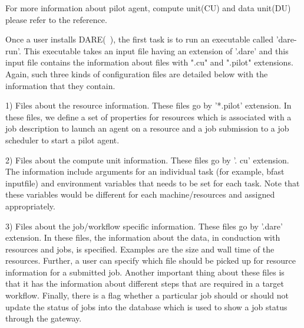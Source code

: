\documentclass[]{svjour3}
\begin{document}
For more information about pilot agent, compute unit(CU) and data unit(DU) please
refer to the reference\cite{pstar11}.

Once a user installs DARE(~\cite{dare_api_web}), the first task is to run an
executable called 'dare-run'. This executable takes an input file having an
extension of '.dare' and this input file contains the information about files
with ".cu" and ".pilot" extensions. Again, such three kinds of configuration
files are detailed below with the information that they contain.

1) Files about the resource information. These files go by '*.pilot' extension.
In these files, we define a set of properties for resources which is associated
with a job description to launch an agent on a resource and a job submission to
a job scheduler to start a pilot agent. 

2) Files about the compute unit information. These files go by '. cu' extension.
The information include arguments for an individual task
(for example, bfast input\textunderscore file) and environment variables that 
needs to be set for each task. Note that these variables would be different for
each machine/resources and assigned appropriately.

3) Files about the job/workflow specific information. These files go by '.dare'
extension. In these files, the information about the data, in conduction with
resources and jobs, is specified. Examples are the size and wall time of the
resources. Further, a user can specify which file should be picked up for
resource information for a submitted job. Another important thing about these
files is that it has the information about different steps that are required in
a target workflow. Finally, there is a flag whether a particular job should or
should not update the status of jobs into the database which is used to show a
job status through the gateway. 
\end{document}
